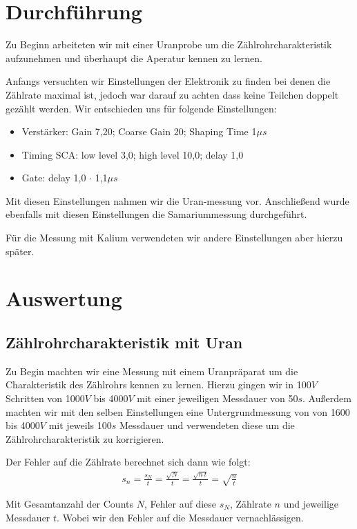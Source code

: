 \documentclass[12pt]{article}
\begin{document}
\section{Durchführung}
Zu Beginn arbeiteten wir mit einer Uranprobe um die Zählrohrcharakteristik aufzunehmen und überhaupt die Aperatur kennen zu lernen.

Anfangs versuchten wir Einstellungen der Elektronik zu finden bei denen die Zählrate maximal ist, jedoch war darauf zu achten dass keine Teilchen doppelt
gezählt werden. Wir entschieden uns für folgende Einstellungen:
\begin{itemize}
 \item Verstärker: Gain 7,20; Coarse Gain 20; Shaping Time 1$\mu s$
 \item Timing SCA: low level 3,0; high level 10,0; delay 1,0
 \item Gate: delay 1,0 $\cdot$ 1,1$\mu s$
\end{itemize}

Mit diesen Einstellungen nahmen wir die Uran-messung vor.
Anschließend wurde ebenfalls mit diesen Einstellungen die Samariummessung durchgeführt.

Für die Messung mit Kalium verwendeten wir andere Einstellungen aber hierzu später.

\section{Auswertung}
\subsection{Zählrohrcharakteristik mit Uran}


Zu Begin machten wir eine Messung mit einem Uranpräparat um die Charakteristik des Zählrohrs kennen zu lernen.
Hierzu gingen wir in 100$V$ Schritten von 1000$V$ bis 4000$V$ mit einer jeweiligen Messdauer von 50$s$.
Außerdem machten wir mit den selben Einstellungen eine Untergrundmessung von von 1600 bis 4000$V$ mit jeweils 100$s$
Messdauer und verwendeten diese um die Zählrohrcharakteristik zu korrigieren.

Der Fehler auf die Zählrate berechnet sich dann wie folgt:
\begin{align}
 s_n = \frac{s_N}{t} = \frac{\sqrt{N}}{t} = \frac{\sqrt{n~t}}{t} = \sqrt{\frac{n}{t}}
\end{align}

Mit Gesamtanzahl der Counts $N$, Fehler auf diese $s_N$, Zählrate $n$ und jeweilige Messdauer $t$. Wobei wir den Fehler auf die Messdauer
vernachlässigen.
\end{document}
